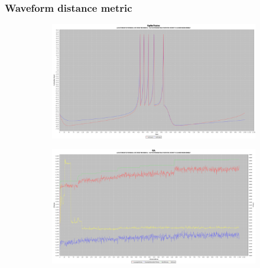 \documentclass[10pt]{article}
\begin{document}
		\subsubsection{Waveform distance metric}
			\begin{figure}[H]
				\centering
					\begin{subfigure}{.5\textwidth}
						\centering
						\includegraphics[width=\linewidth]{./../images/izzy1/wave/plot.png}

						\label{fig:sub3a}
					\end{subfigure}%
					\begin{subfigure}{.5\textwidth}
						\centering
						\includegraphics[width=\linewidth]{./../images/izzy1/wave/prog.png}
						
						\label{fig:sub3b}
					\end{subfigure}
					
					\label{fig:plot3}
			\end{figure}
\end{document}
